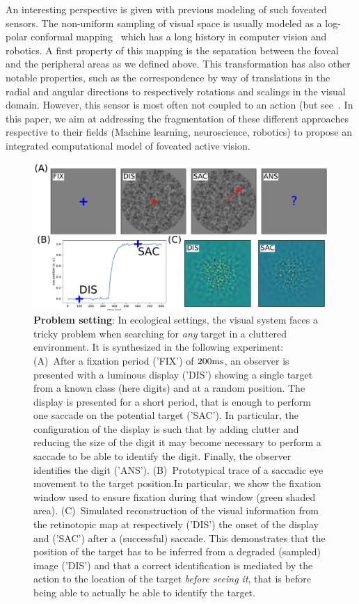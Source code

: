 An interesting perspective is given with previous modeling of such foveated sensors. The non-uniform sampling of visual space is usually modeled as a log-polar conformal mapping~\citep{Traver10} which has a long history in computer vision and robotics. A first property of this mapping is the separation between the foveal and the peripheral areas as we defined above. This transformation has also other notable properties, such as the correspondence by way of translations in the radial and angular directions to respectively rotations and scalings in the visual domain. However, this sensor is most often not coupled to an action (but see~\citep{ref needed)}. In this paper, we aim at addressing the fragmentation of these different approaches respective to their fields (Machine learning, neuroscience, robotics) to propose an integrated computational model of foveated active vision.
\fi
\begin{figure}%
	\includegraphics[width=\linewidth]{fig_intro}
	\caption{
		{\bf Problem setting}: In ecological settings, the visual system faces a tricky problem when searching for \emph{any} target in a cluttered environment. It is synthesized in the following experiment:
		(A)~After a fixation period ('FIX') of $200\si{\milli\second}$, an observer is presented with a luminous display ('DIS') showing a single target from a known class (here digits) and at a random position. The display is presented for a short period, that is enough to perform one saccade on the potential target ('SAC'). \CNS In particular, the configuration of the display is such that by adding clutter and reducing the size of the digit it may become necessary to perform a saccade to be able to identify the digit. Finally, the observer identifies the digit ('ANS'). \fi %
		(B)~Prototypical trace of a saccadic eye movement to the target position.\CNS In particular, we show the fixation window used to ensure fixation during that window (green shaded area). \fi (C)~Simulated reconstruction of the visual information from the retinotopic map at respectively ('DIS') the onset of the display and ('SAC') after a (successful) saccade. \CNS This demonstrates that the position of the target has to be inferred from a degraded (sampled) image ('DIS') and that a correct identification is mediated by the action to the location of the target \emph{before seeing it}, that is before being able to actually be able to identify the target.\fi
		\label{fig:intro}}%
\end{figure}%




